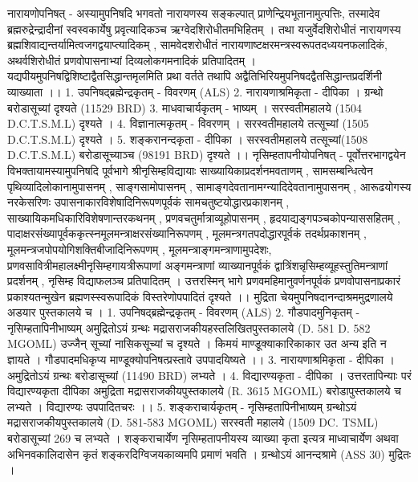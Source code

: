 नारायणोपनिषत् -
अस्यामुपनिषदि भगवतो नारायणस्य सङ्कल्पात् प्राणेन्द्रियभूतानामुत्पत्तिः, तस्मादेव ब्रह्मरुद्रेन्द्रादीनां स्वस्वकार्येषु प्रवृत्यादिकञ्च ऋग्वेदशिरोधीतमभिहितम् । तथा यजुर्वेदशिरोधीतं नारायणस्य ब्रह्मशिवाद्यन्तर्यामित्वजगद्वयाप्त्यादिकम् , सामवेदशरोधीतं नारायणाष्टक्षरमन्त्रस्वरूपतदध्ययनफलादिकं, अथर्वशिरोधीतं प्रणवोपासनाभ्यां दिव्यलोकगमनादिकं प्रतिपादितम् । यद्यपीयमुपनिषद्विशिष्टाद्वैतसिद्धान्तमृलमिति प्रथा वर्तते तथापि अद्वैतिभिरियमुपनिषदद्वैतसिद्धान्तप्रदर्शिनी व्याख्याता ।। 
1. उपनिषद्ब्रह्मेन्द्रकृतम् - विवरणम् (ALS)
2. नारायणाश्रमिकृता - दीपिका । ग्रन्थो बरोडासूच्यां दृश्यते (11529 BRD)
3. माधवाचार्यकृतम् - भाष्यम् । सरस्वतीमहालये (1504 D.C.T.S.M.L) दृश्यते ।
4. विज्ञानात्मकृतम् - विवरणम् । सरस्वतीमहालये तत्सूच्यां (1505 D.C.T.S.M.L) दृश्यते ।
5. शङ्करानन्दकृता - दीपिका । सरस्वतीमहालये तत्सूच्यां(1508 D.C.T.S.M.L) बरोडासूच्याञ्च (98191 BRD) दृश्यते ।।
नृसिम्हतापनीयोपनिषत् - 
पूर्वोत्तरभागद्वयेन विभक्तायामस्यामुपनिषदि पूर्वभागे श्रीनृसिम्हविद्यायाः साख्यायिकाप्रदर्शनमवताणम् , सामसम्बन्धित्वेन पृथिव्यादिलोकानामुपासनम् , साङ्गसामोपासनम् , सामाङ्गदेवतानामग्न्यादिदेवतानामुपासनम् , आरूढयोगस्य नरकेसरिणः उपासनाकारविशेषादिनिरूपणपूर्वकं सामचतुष्टयोद्धारप्रकाशनम् , साख्यायिकमधिकारिविशेषणान्तरकथनम् , प्रणवचतुर्मात्राव्यूहोपासनम् , हृदयाद्यङ्गपञ्चकोपन्याससहितम् , पादाक्षरसंख्यापूर्वककृत्स्नमूलमन्त्राक्षरसंख्यानिरूपणम् , मूलमन्त्रगतपदोद्धारपूर्वकं तदर्थप्रकाशनम् , मूलमन्त्रजपोपयोगिशक्तिबीजादिनिरूपणम् , मूलमन्त्राङ्गमन्त्राणामुपदेशः, प्रणवसावित्रीमहालक्ष्मीनृसिम्हगायत्रीरूपाणां अङ्गमन्त्राणां व्याख्यानपूर्वकं द्वात्रिंशन्नृसिम्हव्यूहस्तुतिमन्त्राणां प्रदर्शनम् , नृसिम्ह विद्याफलञ्च प्रतिपादितम् । 
उत्तरस्मिन् भागे प्रणवमहिमानुवर्णनपूर्वकं प्रणवोपासनाप्रकारं प्रकाश्यतन्मुखेन ब्रह्मणस्स्वरूपादिकं विस्तरेणोपपादितं दृश्यते ।। मुद्रिता चेयमुपनिषदानन्दाश्रममुद्रणालये अडयार पुस्तकालये च । 
1. उपनिषद्ब्रह्मेन्द्रकृतम् - विवरणम् (ALS)
2. गौडपादमुनिकृतम् - नृसिम्हतापिनीभाष्यम् 
अमुद्रितोऽयं ग्रन्थः मद्रासराजकीयहस्तलिखितपुस्तकालये (D. 581 D. 582 MGOML) उज्जैन् सूच्यां नासिकसूच्यां च दृश्यते । किमयं माण्डूक्याकारिकाकार उत अन्य इति न ज्ञायते ।
गौडपादमधिकृप्य माण्डूक्योपनिषत्प्रस्तावे उपपादयिष्यते ।। 
3. नारायणाश्रमिकृता - दीपिका । अमुद्रितोऽयं ग्रन्थः बरोडासूच्यां (11490 BRD) लभ्यते ।
4. विद्यारण्यकृता - दीपिका । उत्तरतापिन्याः परं विद्यारण्यकृता दीपिका अमुद्रिता मद्रासराजकीयपुस्तकालये (R. 3615 MGOML) बरोडापुस्तकालये च लभ्यते । विद्यारण्यः उपपादितचरः ।। 
5. शङ्कराचार्यकृतम् - नृसिम्हतापिनीभाष्यम् 
ग्रन्थोऽयं मद्रासराजकीयपुस्तकालये (D. 581-583 MGOML) सरस्वती महालये (1509 DC. TSML) बरोडासूच्यां 269 च लभ्यते । शङ्कराचार्येण नृसिम्हतापनीयस्य व्याख्या कृता इत्यत्र माध्वाचार्येण अथवा अभिनवकालिदासेन कृतं शङ्करदिग्विजयकाव्यमपि प्रमाणं भवति । ग्रन्थोऽयं आनन्दश्रामे (ASS 30) मुद्रितः ।
